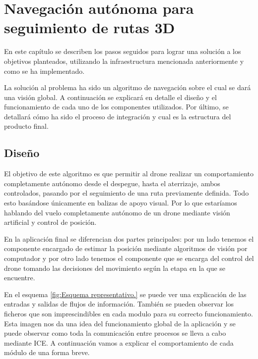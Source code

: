 \chapter{Navegación autónoma para seguimiento de rutas 3D}\label{cap.desarrollo}
\hspace{1cm} En este capítulo se describen los pasos seguidos para lograr una solución a los objetivos planteados, utilizando la infraestructura mencionada anteriormente y como se ha implementado.

\hspace{1cm} La solución al problema ha sido un algoritmo de navegación sobre el cual se dará una visión global. A continuación se explicará en detalle el diseño y el funcionamiento de cada uno de los componentes utilizados. Por último, se detallará cómo ha sido el proceso de integración y cual es la estructura del producto final.


\section{Diseño}
\hspace{1cm} El objetivo de este algoritmo es que permitir al drone realizar un comportamiento completamente autónomo desde el despegue, hasta el aterrizaje, ambos controlados, pasando por el seguimiento de una ruta previamente definida. Todo esto basándose únicamente en balizas de apoyo visual. Por lo que estaríamos hablando del vuelo completamente autónomo de un drone mediante visión artificial y control de posición.

\hspace{1cm} En la aplicación final se diferencian dos partes principales: por un lado tenemos el componente encargado de estimar la posición mediante algoritmos de visión por computador y por otro lado tenemos el componente que se encarga del control del drone tomando las decisiones del movimiento según la etapa en la que se encuentre.

\hspace{1cm} En el esquema \ref{fig:Esquema representativo.} se puede ver una explicación de las entradas y salidas de flujos de información. También se pueden observar los ficheros que son imprescindibles en cada modulo para su correcto funcionamiento. Esta imagen nos da una idea del funcionamiento global de la aplicación y se puede observar como toda la comunicación entre procesos se lleva a cabo mediante ICE. A continuación vamos a explicar el comportamiento de cada módulo de una forma breve. 


